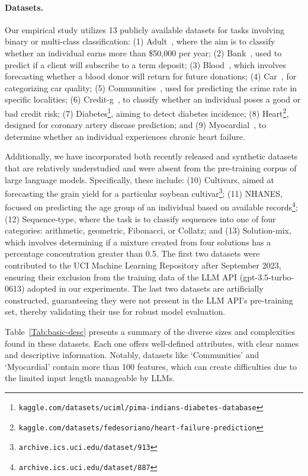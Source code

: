 \paragraph{Datasets.}
Our empirical study utilizes 13 publicly available datasets for tasks involving binary or multi-class classification: (1) Adult~\cite{asuncion2007uci}, where the aim is to classify whether an individual earns more than \$50,000 per year; (2) Bank~\cite{moro2014data}, used to predict if a client will subscribe to a term deposit; (3) Blood~\cite{yeh2009knowledge}, which involves forecasting whether a blood donor will return for future donations; (4) Car~\cite{kadra2021well}, for categorizing car quality; (5) Communities~\cite{misc_communities_and_crime_183}, used for predicting the crime rate in specific localities; (6) Credit-g~\cite{kadra2021well}, to classify whether an individual poses a good or bad credit risk; (7) Diabetes\footnote{\texttt{kaggle.com/datasets/uciml/pima-indians-diabetes-database}}, aiming to detect diabetes incidence; (8) Heart\footnote{\texttt{kaggle.com/datasets/fedesoriano/heart-failure-prediction}}, designed for coronary artery disease prediction; and (9) Myocardial~\cite{misc_myocardial_infarction_complications_579}, to determine whether an individual experiences chronic heart failure.

Additionally, we have incorporated both recently released and synthetic datasets that are relatively understudied and were absent from the pre-training corpus of large language models. Specifically, these include: (10) Cultivars, aimed at forecasting the grain yield for a particular soybean cultivar\footnote{\texttt{archive.ics.uci.edu/dataset/913}}; (11) NHANES, focused on predicting the age group of an individual based on available records\footnote{\texttt{archive.ics.uci.edu/dataset/887}}; (12) Sequence-type, where the task is to classify sequences into one of four categories: arithmetic, geometric, Fibonacci, or Collatz; and (13) Solution-mix, which involves determining if a mixture created from four solutions has a percentage concentration greater than 0.5. The first two datasets were contributed to the UCI Machine Learning Repository after September 2023, ensuring their exclusion from the training data of the LLM API (gpt-3.5-turbo-0613) adopted in our experiments. The last two datasets are artificially constructed, guaranteeing they were not present in the LLM API’s pre-training set, thereby validating their use for robust model evaluation.

Table~\ref{Tab:basic-desc} presents a summary of the diverse sizes and complexities found in these datasets. Each one offers well-defined attributes, with clear names and descriptive information. Notably, datasets like `Communities' and `Myocardial' contain more than 100 features, which can create difficulties due to the limited input length manageable by LLMs.

